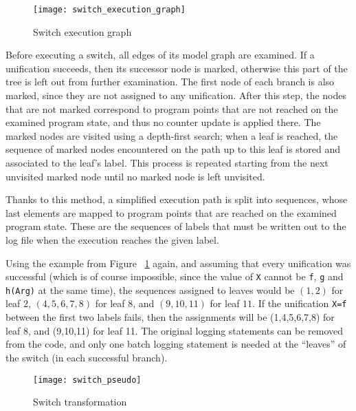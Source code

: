 \documentclass[british]{llncs}
\begin{document}
\begin{figure}
\begin{centering}
\texttt{[image: switch\_execution\_graph]} 
\par\end{centering}

\caption{\label{fig:Switch-execution-graph}Switch execution graph}

\end{figure}


Before executing a switch, all edges of its model graph are examined.
If a unification succeeds, then
its successor node is marked, otherwise this part of the tree is left
out from further examination. The first node of each branch is also marked, since they are not assigned to any unification.
After this step, the nodes that
are not marked correspond to program points that are not reached on
the examined program state, and thus no counter update is applied
there. 
The marked nodes are visited using a depth-first search; when a leaf is reached, the sequence of marked nodes encountered on the path up to this leaf is stored and associated to the leaf's label. This process is repeated starting from the next unvisited marked node until no marked node is left unvisited.


Thanks to this method, a simplified execution path is split into sequences, whose last elements
are mapped to program points that are reached on the examined program
state. These are the sequences of labels that must be written out
to the log file when the execution reaches the given label. 

Using the example from Figure~ \ref{fig:Switch-execution-graph} again, and assuming that every unification was successful (which
is of course impossible, since the value of \texttt{X} cannot be \texttt{f},
\texttt{g} and \texttt{h(Arg)} at the same time), the sequences
assigned to leaves would be $(1,2)$ for leaf $2$, $(4,5,6,7,8)$ for leaf $8$, and $(9,10,11)$ for leaf $11$.
If the unification \texttt{X=f} between the first two labels fails,
then the assignments will be (1,4,5,6,7,8) for leaf 8, and (9,10,11) for leaf 11. The original
logging statements can be removed from the code, and only one batch logging
statement is needed at the {}``leaves'' of the switch (in each successful
branch).

\begin{figure}
\begin{centering}
\texttt{[image: switch\_pseudo]} 
\par\end{centering}

\caption{\label{fig:Switch-transformation}Switch transformation}

\end{figure}
\end{document}
